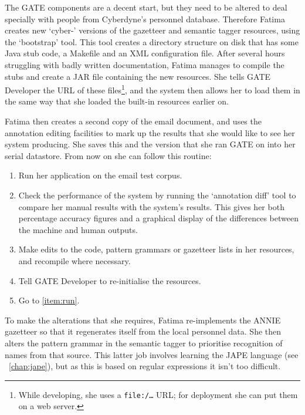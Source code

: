 The GATE components are a decent start, but they need to be altered to
deal specially with people from Cyberdyne's personnel
database. Therefore Fatima creates new `cyber-' versions of the
gazetteer and semantic tagger resources, using the `bootstrap'
tool. This tool creates a directory structure on disk that has some
Java stub code, a Makefile and an XML configuration file.  After
several hours struggling with badly written documentation, Fatima
manages to compile the stubs and create a JAR file containing the new
resources. She tells GATE Developer the URL of these
files\footnote{While developing, she uses a {\tt file:/\ldots} URL;
for deployment she can put them on a web server.}, and the system then
allows her to load them in the same way that she loaded the built-in
resources earlier on.

Fatima then creates a second copy of the email document, and uses the annotation
editing facilities to mark up the results that she would like to see her system
producing. She saves this and the version that she ran GATE on into her serial
datastore. From now on she can follow this routine:
\begin{enumerate}
\item\label{item:run}
Run her application on the email test corpus.
\item
Check the performance of the system by running the `annotation diff' tool to
compare her manual results with the system's results. This gives her both
percentage accuracy figures and a graphical display of the differences
between the machine and human outputs.
\item
Make edits to the code, pattern grammars or gazetteer lists in her resources,
and recompile where necessary.
\item
Tell GATE Developer to re-initialise the resources.
\item
Go to \ref{item:run}.
\end{enumerate}
%
To make the alterations that she requires, Fatima re-implements the ANNIE
gazetteer so that it regenerates itself from the local personnel data.
She then alters the pattern grammar in the semantic tagger to prioritise
recognition of names from that source. This latter job involves learning the
JAPE language (see \Chapthing\ \ref{chap:jape}), but as this is based on
regular expressions it isn't too difficult.

